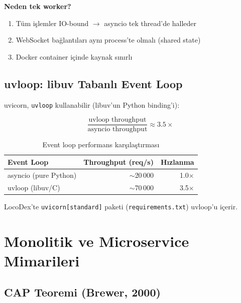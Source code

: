 \textbf{Neden tek worker?}
\begin{enumerate}
  \item T\"{u}m i\c{s}lemler IO-bound $\to$ asyncio tek thread'de halleder
  \item WebSocket ba\u{g}lant{\i}lar{\i} ayn{\i} process'te olmal{\i} (shared state)
  \item Docker container i\c{c}inde kaynak s{\i}n{\i}rl{\i}
\end{enumerate}

\subsection{uvloop: libuv Tabanl{\i} Event Loop}
\label{sec:uvloop}

uvicorn, \texttt{uvloop} kullanabilir (libuv'un Python binding'i):

\begin{equation}
\label{eq:uvloop-speedup}
\frac{\text{uvloop throughput}}{\text{asyncio throughput}} \approx 3.5\times
\end{equation}

\begin{table}[H]
\centering
\caption{Event loop performans kar\c{s}{\i}la\c{s}t{\i}rmas{\i}}
\label{tab:uvloop}
\begin{tabularx}{0.8\textwidth}{Xrr}
\toprule
\color{chapterBlue}\textbf{Event Loop} & \color{chapterBlue}\textbf{Throughput (req/s)} & \color{chapterBlue}\textbf{H{\i}zlanma} \\
\midrule
asyncio (pure Python) & $\sim$20\,000 & 1.0$\times$ \\
uvloop (libuv/C)      & $\sim$70\,000 & 3.5$\times$ \\
\bottomrule
\end{tabularx}
\end{table}

LocoDex'te \texttt{uvicorn[standard]} paketi (\texttt{requirements.txt}) uvloop'u i\c{c}erir.



\section{Monolitik ve Microservice Mimarileri}
\label{sec:monolith-vs-micro}

\subsection{CAP Teoremi (Brewer, 2000)}
\label{sec:cap}

